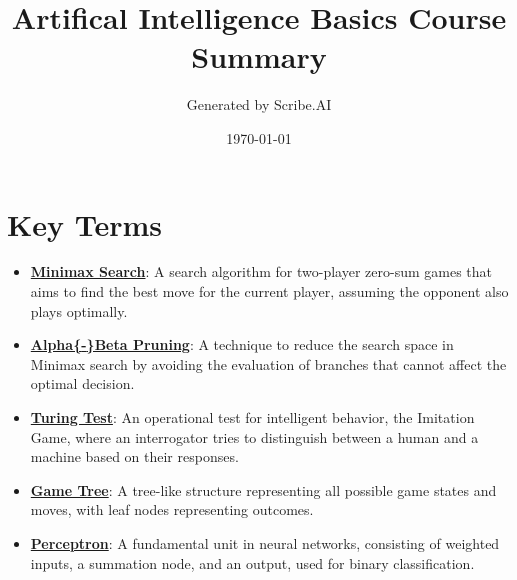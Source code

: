 \documentclass{article}%
\title{Artifical Intelligence Basics Course Summary}%
\author{Generated by Scribe.AI}%
\date{\today}%
\begin{document}
%
\normalsize%
\maketitle%
\section{Key Terms}%
\label{sec:KeyTerms}%
\begin{itemize}[leftmargin=*]%
\item \href{https://purdue.brightspace.com/d2l/common/assets/pdfjs-d2l-dist/1.0.14-legacy/web/viewer.html?file=\%2Fcontent\%2Fenforced\%2F1095467-wl.202510.CS.24300.001\%2F02L2-Intro.pdf\%3Fou\%3D1095467\&lang=en-us\&container=d2l-fileviewer-rendered-pdf\&fullscreen=d2l-fileviewer-rendered-pdf-dialog\&height=667#page=22}{\textbf{Minimax Search}}: A search algorithm for two{-}player zero{-}sum games that aims to find the best move for the current player, assuming the opponent also plays optimally.%
\item \href{https://purdue.brightspace.com/d2l/common/assets/pdfjs-d2l-dist/1.0.14-legacy/web/viewer.html?file=\%2Fcontent\%2Fenforced\%2F1095467-wl.202510.CS.24300.001\%2F02L2-Intro.pdf\%3Fou\%3D1095467\&lang=en-us\&container=d2l-fileviewer-rendered-pdf\&fullscreen=d2l-fileviewer-rendered-pdf-dialog\&height=667#page=23}{\textbf{Alpha\{{-}\}Beta Pruning}}: A technique to reduce the search space in Minimax search by avoiding the evaluation of branches that cannot affect the optimal decision.%
\item \href{https://purdue.brightspace.com/d2l/common/assets/pdfjs-d2l-dist/1.0.14-legacy/web/viewer.html?file=\%2Fcontent\%2Fenforced\%2F1095467-wl.202510.CS.24300.001\%2F02L2-Intro.pdf\%3Fou\%3D1095467\&lang=en-us\&container=d2l-fileviewer-rendered-pdf\&fullscreen=d2l-fileviewer-rendered-pdf-dialog\&height=667#page=6}{\textbf{Turing Test}}: An operational test for intelligent behavior, the Imitation Game, where an interrogator tries to distinguish between a human and a machine based on their responses.%
\item \href{https://purdue.brightspace.com/d2l/common/assets/pdfjs-d2l-dist/1.0.14-legacy/web/viewer.html?file=\%2Fcontent\%2Fenforced\%2F1095467-wl.202510.CS.24300.001\%2F02L2-Intro.pdf\%3Fou\%3D1095467\&lang=en-us\&container=d2l-fileviewer-rendered-pdf\&fullscreen=d2l-fileviewer-rendered-pdf-dialog\&height=667#page=11}{\textbf{Game Tree}}: A tree{-}like structure representing all possible game states and moves, with leaf nodes representing outcomes.%
\item \href{https://purdue.brightspace.com/d2l/common/assets/pdfjs-d2l-dist/1.0.14-legacy/web/viewer.html?file=\%2Fcontent\%2Fenforced\%2F1095467-wl.202510.CS.24300.001\%2F02L2-Intro.pdf\%3Fou\%3D1095467\&lang=en-us\&container=d2l-fileviewer-rendered-pdf\&fullscreen=d2l-fileviewer-rendered-pdf-dialog\&height=667#page=45}{\textbf{Perceptron}}: A fundamental unit in neural networks, consisting of weighted inputs, a summation node, and an output, used for binary classification.%

\end{itemize}
\end{document}
